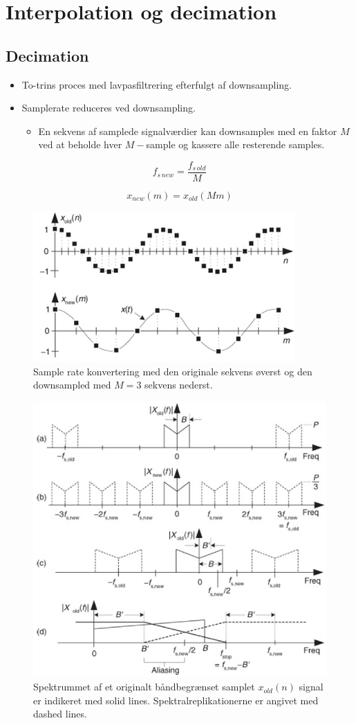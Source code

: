 \documentclass[danish]{article}
\begin{document}
\newpage
\section{Interpolation og decimation}
\subsection{Decimation}
\begin{itemize}
	\item To-trins proces med lavpasfiltrering efterfulgt af downsampling.
	\item Samplerate reduceres ved downsampling.
	\begin{itemize}
		\item En sekvens af samplede signalværdier kan downsamples med en faktor $M$ ved at beholde hver $M-$sample og kassere alle resterende samples.
	\end{itemize}
\end{itemize}

\begin{equation}
f_{s\, new} = \frac{f_{s\, old}}{M}
\end{equation}

\begin{equation}
x_{new}(m) = x_{old}(Mm)
\end{equation}

\begin{figure}[H]
	\centering
	\includegraphics[width=0.6\linewidth]{graphics/decimation}
	\caption{Sample rate konvertering med den originale sekvens øverst og den downsampled med $M = 3$ sekvens nederst.}
	\label{fig:decimation}
\end{figure}

\begin{figure}[H]
	\centering
	\includegraphics[width=0.6\linewidth]{graphics/decimation1}
	\caption{Spektrummet af et originalt båndbegrænset samplet $x_{old}(n)$ signal er indikeret med solid lines. Spektralreplikationerne er angivet med dashed lines.}
	\label{fig:decimation1}
\end{figure}
\end{document}
